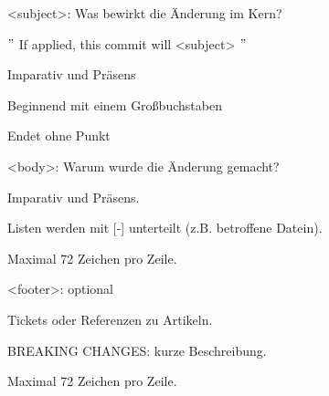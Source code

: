 \documentclass[
   draft=false
  ,paper=a4
  ,twoside=false
  ,fontsize=11pt
  ,headsepline
  ,DIV=11
  ,parskip=full+
  ,titlepage
]{scrartcl} %
\begin{document}
\begin{compactitem}
\begin{compactitem}
         \item[<subject>:] Was bewirkt die Änderung im Kern?
            \begin{compactitem}
              \item $"$ If applied, this commit will <subject> $"$
              \item Imparativ und Präsens       
              \item Beginnend mit einem Großbuchstaben
              \item Endet ohne Punkt
            \end{compactitem} 
      \end{compactitem}
    \item[<body>:] Warum wurde die Änderung gemacht?
    \begin{compactitem}
        \item Imparativ und Präsens.       
        \item Listen werden mit [-] unterteilt (z.B. betroffene Datein).
        \item Maximal 72 Zeichen pro Zeile.
      \end{compactitem} 
    \item[<footer>:] optional
      \begin{compactitem}
        \item Tickets oder Referenzen zu Artikeln.       
        \item BREAKING CHANGES: kurze Beschreibung.
        \item Maximal 72 Zeichen pro Zeile.
      \end{compactitem}

  \end{compactitem}
\newpage
\end{document}
